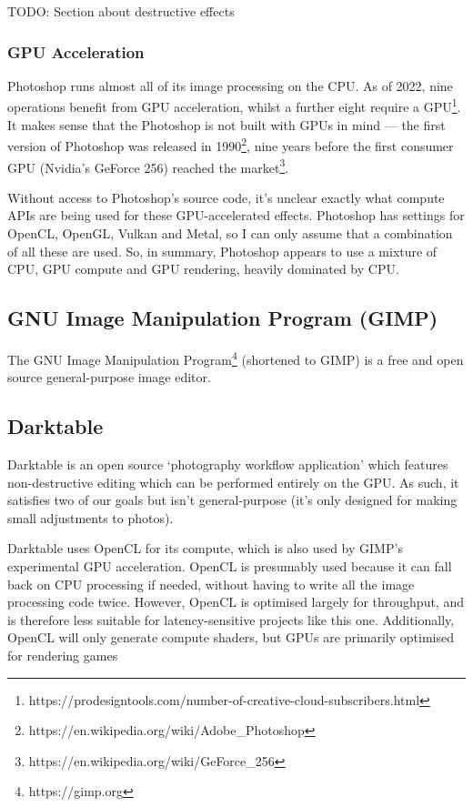 \documentclass[12pt]{article}
\begin{document}
TODO: Section about destructive effects

\subsubsection{GPU Acceleration}

Photoshop runs almost all of its image processing on the CPU.  As of 2022, nine operations benefit from
GPU acceleration, whilst a further eight require a
GPU\footnote{https://prodesigntools.com/number-of-creative-cloud-subscribers.html}.  It makes sense
that the Photoshop is not built with GPUs in mind --- the first version of Photoshop was released in
1990\footnote{https://en.wikipedia.org/wiki/Adobe\_Photoshop}, nine years before the first consumer
GPU (Nvidia's GeForce 256) reached the market\footnote{https://en.wikipedia.org/wiki/GeForce\_256}.

Without access to Photoshop's source code, it's unclear exactly what compute APIs are being used for
these GPU-accelerated effects.  Photoshop has settings for OpenCL, OpenGL, Vulkan and Metal, so I
can only assume that a combination of all these are used.  So, in summary, Photoshop appears to use
a mixture of CPU, GPU compute and GPU rendering, heavily dominated by CPU.

\subsection{GNU Image Manipulation Program (GIMP)}

The GNU Image Manipulation Program\footnote{https://gimp.org} (shortened to GIMP) is a free and open
source general-purpose image editor.

\subsection{Darktable}

Darktable is an open source `photography workflow application' which features non-destructive
editing which can be performed entirely on the GPU.  As such, it satisfies two of our goals but
isn't general-purpose (it's only designed for making small adjustments to photos).

Darktable uses OpenCL for its compute, which is also used by GIMP's experimental GPU acceleration.
OpenCL is presumably used because it can fall back on CPU processing if needed, without having to
write all the image processing code twice.  However, OpenCL is optimised largely for throughput, and
is therefore less suitable for latency-sensitive projects like this one.  Additionally, OpenCL will
only generate compute shaders, but GPUs are primarily optimised for rendering games
\end{document}

